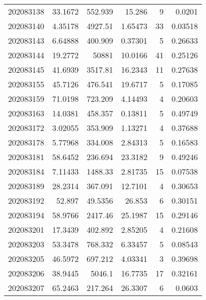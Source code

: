 \begin{tabular}{rrrrrr}
 202083138 &         33.1672  &      552.939  &           15.286   &           9 & 0.0201  \\
 202083140 &          4.35178 &     4927.51   &            1.65473 &          33 & 0.03518 \\
 202083143 &          6.64888 &      400.909  &            0.37301 &           5 & 0.26633 \\
 202083144 &         19.2772  &    50881      &           10.0166  &          41 & 0.25126 \\
 202083145 &         41.6939  &     3517.81   &           16.2343  &          11 & 0.27638 \\
 202083155 &         45.7126  &      476.541  &           19.6717  &           5 & 0.17085 \\
 202083159 &         71.0198  &      723.209  &            4.14493 &           4 & 0.20603 \\
 202083163 &         14.0381  &      458.357  &            0.13811 &           5 & 0.49749 \\
 202083172 &          3.02055 &      353.909  &            1.13271 &           4 & 0.37688 \\
 202083178 &          5.77968 &      334.008  &            2.84313 &           5 & 0.16583 \\
 202083181 &         58.6452  &      236.694  &           23.3182  &           9 & 0.49246 \\
 202083184 &          7.11433 &     1488.33   &            2.81735 &          15 & 0.07538 \\
 202083189 &         28.2314  &      367.091  &           12.7101  &           4 & 0.30653 \\
 202083192 &         52.897   &       49.5356 &           26.853   &           6 & 0.30151 \\
 202083194 &         58.9766  &     2417.46   &           25.1987  &          15 & 0.29146 \\
 202083201 &         17.3439  &      402.892  &            2.85205 &           4 & 0.21608 \\
 202083203 &         53.3478  &      768.332  &            6.33457 &           5 & 0.08543 \\
 202083205 &         46.5972  &      697.212  &            4.03341 &           3 & 0.39698 \\
 202083206 &         38.9445  &     5046.1    &           16.7735  &          17 & 0.32161 \\
 202083207 &         65.2463  &      217.264  &           26.3307  &           6 & 0.0603  \\

\end{tabular}
